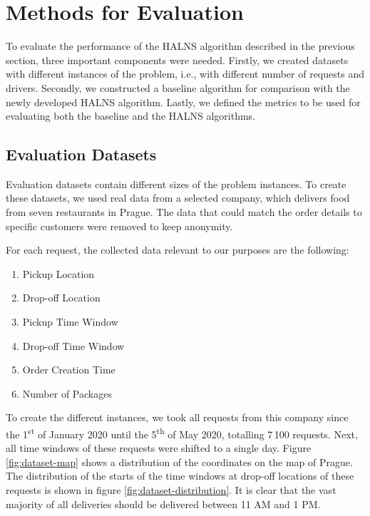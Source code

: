 \section{Methods for Evaluation}
    
    To evaluate the performance of the HALNS algorithm described in the previous section, three important components were needed. Firstly, we created datasets with different instances of the problem, i.e., with different number of requests and drivers. Secondly, we constructed a baseline algorithm for comparison with the newly developed HALNS algorithm. Lastly, we defined the metrics to be used for evaluating both the baseline and the HALNS algorithms.

    \subsection{Evaluation Datasets} \label{sec:dataset}
    
    Evaluation datasets contain different sizes of the problem instances. To create these datasets, we used real data from a selected company, which delivers food from seven restaurants in Prague. The data that could match the order details to specific customers were removed to keep anonymity.
    
    For each request, the collected data relevant to our purposes are the following:
    
    \begin{enumerate}
        \item Pickup Location
        \item Drop-off Location
        \item Pickup Time Window
        \item Drop-off Time Window
        \item Order Creation Time
        \item Number of Packages
    \end{enumerate}

     To create the different instances, we took all requests from this company since the 1\textsuperscript{st} of January 2020 until the 5\textsuperscript{th} of May 2020, totalling 7\,100 requests. Next, all time windows of these requests were shifted to a single day. Figure \ref{fig:dataset-map} shows a distribution of the coordinates on the map of Prague. The distribution of the starts of the time windows at drop-off locations of these requests is shown in figure \ref{fig:dataset-distribution}. It is clear that the vast majority of all deliveries should be delivered between 11 AM and 1 PM.
    
